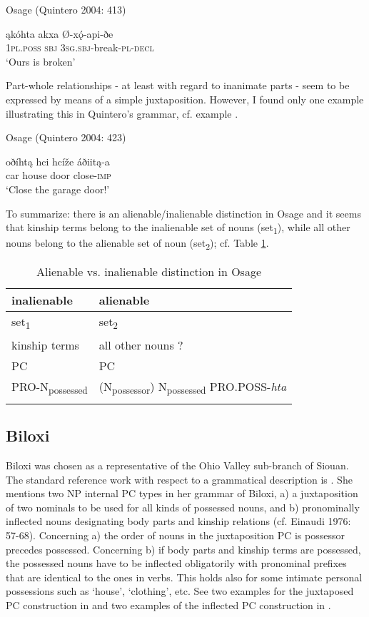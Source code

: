 \documentclass[output=paper]{LSP/langsci}
\begin{document}
\ea	Osage (Quintero 2004: 413) \label{osagebroken}

\gll ąkóhta     akxa     Ø-xǫ́-api-ðe \\
\textsc{1pl.poss} \textsc{sbj} \textsc{3sg.sbj}-break-\textsc{pl-decl} \\
\glt `Ours is broken'
\z 

Part-whole relationships - at least with regard to inanimate parts - seem to be expressed by means of a simple juxtaposition. However, I found only one example illustrating this in Quintero's grammar, cf. example .

\ea	Osage (Quintero 2004: 423) \label{osagegarage}

\gll oðíhtą hci      hcíže áðiitą-a \\
car       house door close-\textsc{imp} \\
\glt `Close the garage door!'
\z

To summarize: there is an alienable/inalienable distinction in Osage and it seems that kinship terms belong to the inalienable set of nouns (set\textsubscript{1}), while all other nouns belong to the alienable set of noun (set\textsubscript{2}); cf. Table \ref{osagealienability}.

\begin{table}
\caption{Alienable vs. inalienable distinction in Osage} \label{osagealienability}
\begin{tabular}[h!]{ l l }
\lsptoprule
inalienable & alienable \\
\midrule
set\textsubscript{1} & set\textsubscript{2} \\
 
kinship terms & 	all other nouns ? \\
\hline
PC	& PC \\
\hline
PRO-N\textsubscript{possessed} & (N\textsubscript{possessor}) N\textsubscript{possessed} PRO.POSS-\textit{hta} \\
\lspbottomrule
\end{tabular}
\end{table}

\subsection{Biloxi}
Biloxi was chosen as a representative of the Ohio Valley sub-branch of Siouan. The standard reference work with respect to a grammatical description is \citet{Einaudi1976}. She mentions two NP internal PC types in her grammar of Biloxi, a) a juxtaposition of two nominals to be used for all kinds of possessed nouns, and b) pronominally inflected nouns designating body parts and kinship relations (cf. Einaudi 1976: 57-68). Concerning a) the order of nouns in the juxtaposition PC is possessor precedes possessed. Concerning b) if body parts and kinship terms are possessed, the possessed nouns have to be inflected obligatorily with pronominal prefixes that are identical to the ones in verbs. This holds also for some intimate personal possessions such as `house', `clothing', etc. See two examples for the juxtaposed PC construction in  and two examples of the inflected PC construction in .
\end{document}
